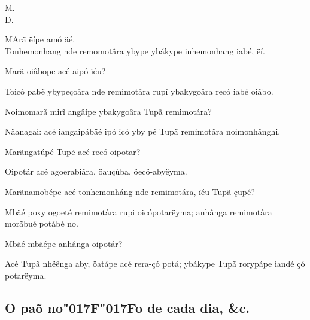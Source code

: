 \documentclass[openany,titlepage,12pt]{book}
\newcommand{\lgSS}{\char"017F\char"017F}
\newcommand{\comecalista}[5]{
    \hspace*{-11.7pt}
    \begin{minipage}[t]{0.08\linewidth}
        \flushright #1\\#2
    \end{minipage}
    \hspace{0pt}
    \begin{minipage}[t]{0.94\linewidth}
        \lettrine
        [findent =2pt, nindent=0pt,  lines=2]
        {#3}{#4}#5
    \end{minipage}
    \vspace*{-3pt}
}
\begin{document}
\comecalista{M.}{D.}{M}{A}
    {rã ëípe amó äé.\\
    Tonhemonhang nde remomotâra ybype
    ybákype inhemonhang iabé, ëí.}
\begin{alternate}
    \item Marã oiâbope acé aipó ïéu?
    \item Toicó pabẽ ybypeçoâra nde remimotâra
    rupí ybakygoâra recó iabé oiâbo.
    \item Noimomarã mirĩ angâipe ybakygoâra\linebreak
    Tupã remimotára?
    \item Näanagai: acé iangaipábäé ipó icó yby pé Tupã
    remimotâra noimonhânghi.
    \item Marãngatúpé Tupẽ acé recó oipotar?
    \item Oipotár acé agoerabiâra, öauçûba, öecö-abyëyma.
    \item Marãnamobépe acé tonhemonháng nde remimotára,
    ïéu Tupã çupé?
    \item Mbäé poxy ogoeté remimotâra rupi oicópotarëyma;
    anhânga remimotâra morãbué potábé no.
    \item Mbäé mbäépe anhânga oipotár?
    \item Acé Tupã nhëênga aby, öatápe acé rera-çó potá;
    ybákype Tupã rorypápe iandé çó potarëyma.
\end{alternate}

\subsection{O paõ no\lgSS o de cada dia, \&c.}
\end{document}
